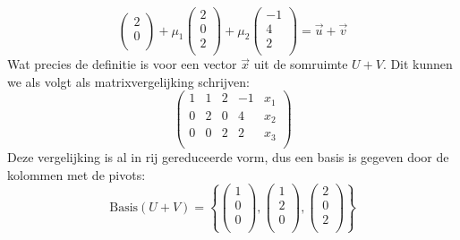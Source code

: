 \documentclass[12pt, a4paper]{article}
\begin{document}
\begin{enumerate}[(a.)]
\begin{equation}
\begin{pmatrix}
        2 \\
        0 \\
    \end{pmatrix}
    +
    \mu_1\begin{pmatrix}
        2 \\
        0 \\
        2 \\
    \end{pmatrix}
    +
    \mu_2\begin{pmatrix}
        -1 \\
        4 \\
        2 \\
    \end{pmatrix}
    =
    \vec{u} + \vec{v}
\end{equation}
Wat precies de definitie is voor een vector $\vec{x}$ uit de somruimte $U + V$. 
Dit kunnen we als volgt als matrixvergelijking schrijven:
\begin{equation}
    \left(\begin{array}{cccc|c}
        1 & 1 & 2 & -1 & x_1\\
        0 & 2 & 0 & 4 & x_2\\
        0 & 0 & 2 & 2 & x_3\\
    \end{array}\right)
\end{equation}
Deze vergelijking is al in rij gereduceerde vorm, 
dus een basis is gegeven door de kolommen met de pivots:
\begin{equation}
    \text{Basis}(U + V) = 
    \left\{ 
        \begin{pmatrix}
            1 \\
            0 \\
            0 \\
        \end{pmatrix}
        ,
        \begin{pmatrix}
            1 \\
            2 \\
            0 \\
        \end{pmatrix}
        ,
        \begin{pmatrix}
            2 \\
            0 \\
            2 \\
        \end{pmatrix}
    \right\}
\end{equation}

\end{enumerate}
\end{document}
